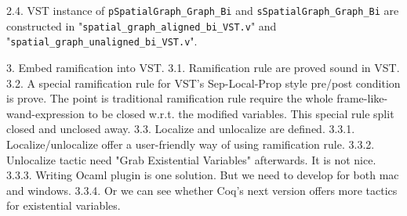 




2.4. VST instance of \texttt{pSpatialGraph\_Graph\_Bi} and \texttt{sSpatialGraph\_Graph\_Bi} are constructed in "\texttt{spatial\_graph\_aligned\_bi\_VST.v}" and "\texttt{spatial\_graph\_unaligned\_bi\_VST.v}".

3. Embed ramification into VST.
3.1. Ramification rule are proved sound in VST.
3.2. A special ramification rule for VST's Sep-Local-Prop style pre/post condition is prove. The point is traditional ramification rule require the whole frame-like-wand-expression to be closed w.r.t. the modified variables. This special rule split closed and unclosed away.
3.3. Localize and unlocalize are defined.
3.3.1. Localize/unlocalize offer a user-friendly way of using ramification rule.
3.3.2. Unlocalize tactic need "Grab Existential Variables" afterwards. It is not nice.
3.3.3. Writing Ocaml plugin is one solution. But we need to develop for both mac and windows.
3.3.4. Or we can see whether Coq's next version offers more tactics for existential variables.
